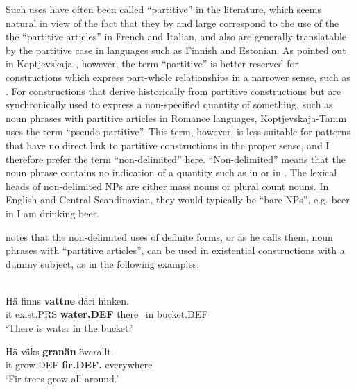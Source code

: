 Such uses have often been called “partitive” in the literature, which seems natural in view of the fact that they by and large correspond to the use of the the “partitive articles” in French and Italian, and also are generally translatable by the partitive case in languages such as Finnish and Estonian. As pointed out in Koptjevskaja-\citet[525]{Tamm2001}, however, the term “partitive” is better reserved for constructions which express part-whole relationships in a narrower sense, such as . For constructions that derive historically from partitive constructions but are synchronically used to express a non-specified quantity of something, such as noun phrases with partitive articles in Romance languages, Koptjevskaja-Tamm uses the term “pseudo-partitive”. This term, however, is less suitable for patterns that have no direct link to partitive constructions in the proper sense, and I therefore prefer the term “non-delimited” here. “Non-delimited” means that the noun phrase contains no indication of a quantity such as  in or  in . The lexical heads of non-delimited NPs are either mass nouns or plural count nouns. In English and Central Scandinavian, they would typically be “bare NPs”, e.g. beer in I am drinking beer. 


\citet[51]{Delsing1993} notes that the non-delimited uses of definite forms, or as he calls them, noun phrases with “partitive articles”, can be used in existential constructions with a dummy subject, as in the following examples: 


\ea\label{}
\\
\gll 	Hä  finns  \textbf{vattne} däri  hinken.\\
		it  exist.PRS  \textbf{water.DEF} there\_in  bucket.DEF\\
\glt 	‘There is water in the bucket.’

\z

\ea
\gll 	Hä  väks  \textbf{granän} överallt.\\
		it  grow.DEF  \textbf{fir.DEF.} everywhere\\
\glt 	‘Fir trees grow all around.’
\z

